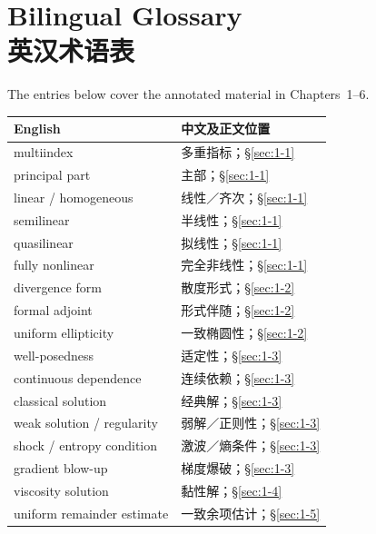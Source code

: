 \chapter*{Bilingual Glossary\\英汉术语表}
The entries below cover the annotated material in Chapters~1--6.

\begin{center}\small
\begin{tabular}{@{}p{.53\linewidth}p{.38\linewidth}@{}}
\textbf{English}&\textbf{中文及正文位置}\\\hline
multiindex & 多重指标；\S\ref{sec:1-1}\\
principal part & 主部；\S\ref{sec:1-1}\\
linear / homogeneous & 线性／齐次；\S\ref{sec:1-1}\\
semilinear & 半线性；\S\ref{sec:1-1}\\
quasilinear & 拟线性；\S\ref{sec:1-1}\\
fully nonlinear & 完全非线性；\S\ref{sec:1-1}\\
divergence form & 散度形式；\S\ref{sec:1-2}\\
formal adjoint & 形式伴随；\S\ref{sec:1-2}\\
uniform ellipticity & 一致椭圆性；\S\ref{sec:1-2}\\
well-posedness & 适定性；\S\ref{sec:1-3}\\
continuous dependence & 连续依赖；\S\ref{sec:1-3}\\
classical solution & 经典解；\S\ref{sec:1-3}\\
weak solution / regularity & 弱解／正则性；\S\ref{sec:1-3}\\
shock / entropy condition & 激波／熵条件；\S\ref{sec:1-3}\\
gradient blow-up & 梯度爆破；\S\ref{sec:1-3}\\
viscosity solution & 黏性解；\S\ref{sec:1-4}\\
uniform remainder estimate & 一致余项估计；\S\ref{sec:1-5}
\end{tabular}
\end{center}

